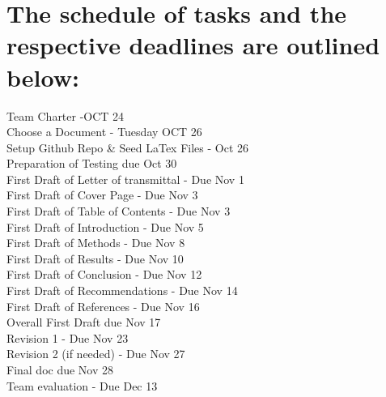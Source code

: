 \documentclass[12pt,A4paper]{article}
\begin{document}
\section{The schedule of tasks and the respective deadlines are outlined below:}
	Team Charter -OCT 24 \\
	Choose a Document - Tuesday OCT 26 \\
	Setup Github Repo \& Seed LaTex Files - Oct 26 \\
	Preparation of Testing due Oct 30 \\
	First Draft of Letter of transmittal - Due Nov 1 \\
	First Draft of Cover Page - Due Nov 3 \\
	First Draft of Table of Contents - Due Nov 3 \\
	First Draft of Introduction - Due Nov 5 \\
	First Draft of Methods - Due Nov 8 \\
	First Draft of Results - Due Nov 10 \\
	First Draft of Conclusion - Due Nov 12 \\
	First Draft of Recommendations - Due Nov 14 \\
	First Draft of References - Due Nov 16 \\
	Overall First Draft due Nov 17 \\
	Revision 1 - Due Nov 23 \\
	Revision 2 (if needed) - Due Nov 27 \\
	Final doc due Nov 28 \\
	Team evaluation - Due Dec 13 \\
	
\end{document}

